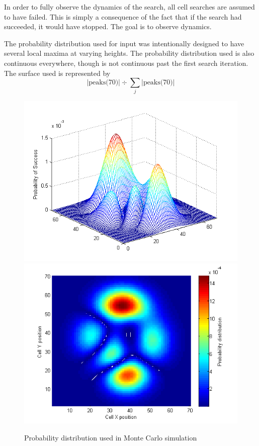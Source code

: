 \documentclass[a4paper]{article}
\begin{document}
In order to fully observe the dynamics of the search, all cell searches are assumed to have failed. This is simply a consequence of the fact that if the search had succeeded, it would have stopped. The goal is to observe dynamics.

The probability distribution used for input was intentionally designed to have several local maxima at varying heights. The probability distribution used is also continuous everywhere, though is not continuous past the first search iteration. The surface used is represented by $$|\mbox{peaks(70)}|\div \sum_j |\text{peaks(70)}|$$

\begin{figure}[H]\begin{center}
\includegraphics[scale=0.5]{../Matlab/Images/InitialProbDist.png}
\includegraphics[scale=0.5]{../Matlab/Images/InitialProbDistSurf.png}
\caption{Probability distribution used in Monte Carlo simulation}
\end{center}\end{figure}
\end{document}
